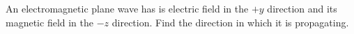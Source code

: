 An electromagnetic plane wave has is electric field in the $+y$ direction
and its magnetic field in the $-z$ direction. Find the direction in which
it is propagating.
